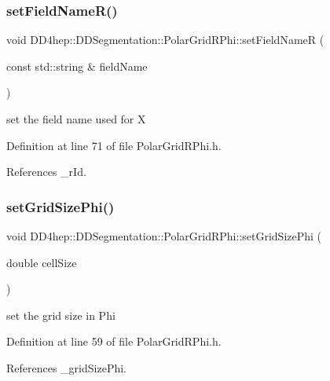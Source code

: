 \subsubsection{\texorpdfstring{set\+Field\+Name\+R()}{setFieldNameR()}}
{\footnotesize\ttfamily void D\+D4hep\+::\+D\+D\+Segmentation\+::\+Polar\+Grid\+R\+Phi\+::set\+Field\+NameR (\begin{DoxyParamCaption}\item[{const std\+::string \&}]{field\+Name }\end{DoxyParamCaption})\hspace{0.3cm}{\ttfamily [inline]}}



set the field name used for X 



Definition at line 71 of file Polar\+Grid\+R\+Phi.\+h.



References \+\_\+r\+Id.

\hypertarget{class_d_d4hep_1_1_d_d_segmentation_1_1_polar_grid_r_phi_af50d9792d10242bbc70cbd07709bc82b}{}\label{class_d_d4hep_1_1_d_d_segmentation_1_1_polar_grid_r_phi_af50d9792d10242bbc70cbd07709bc82b} 
\subsubsection{\texorpdfstring{set\+Grid\+Size\+Phi()}{setGridSizePhi()}}
{\footnotesize\ttfamily void D\+D4hep\+::\+D\+D\+Segmentation\+::\+Polar\+Grid\+R\+Phi\+::set\+Grid\+Size\+Phi (\begin{DoxyParamCaption}\item[{double}]{cell\+Size }\end{DoxyParamCaption})\hspace{0.3cm}{\ttfamily [inline]}}



set the grid size in Phi 



Definition at line 59 of file Polar\+Grid\+R\+Phi.\+h.



References \+\_\+grid\+Size\+Phi.

\hypertarget{class_d_d4hep_1_1_d_d_segmentation_1_1_polar_grid_r_phi_ab757b018648dc4207f94ab1d13d990ef}{}\label{class_d_d4hep_1_1_d_d_segmentation_1_1_polar_grid_r_phi_ab757b018648dc4207f94ab1d13d990ef} 
